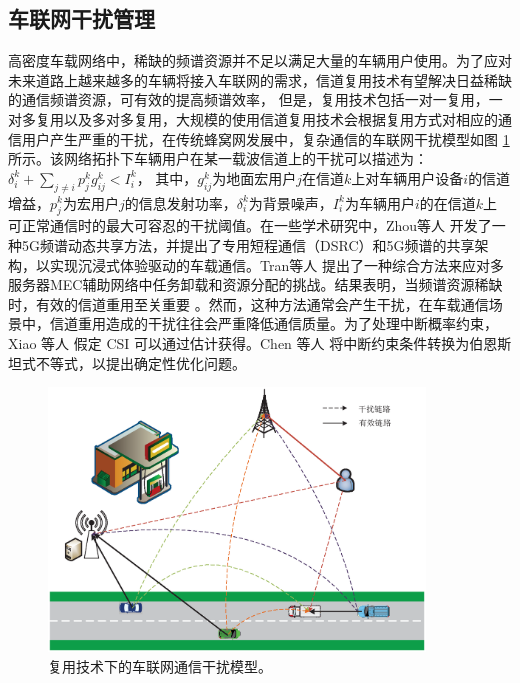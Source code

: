 \subsection{车联网干扰管理}\label{section1-2-1}

高密度车载网络中，稀缺的频谱资源并不足以满足大量的车辆用户使用。为了应对未来道路上越来越多的车辆将接入车联网的需求，信道复用技术有望解决日益稀缺的通信频谱资源，可有效的提高频谱效率，
但是，复用技术包括一对一复用，一对多复用以及多对多复用，大规模的使用信道复用技术会根据复用方式对相应的通信用户产生严重的干扰，在传统蜂窝网发展中，复杂通信的车联网干扰模型如图 \ref{复用技术下的通信干扰模型} 所示。该网络拓扑下车辆用户在某一载波信道上的干扰可以描述为：$\delta _{i}^{k}+\sum\limits_{j\ne i}{p_{j}^{k}g_{ij}^{k}}<I_{i}^{k}$，
其中，$g_{ij}^{k}$为地面宏用户$j$在信道$k$上对车辆用户设备$i$的信道增益，$p_{j}^{k}$为宏用户$j$的信息发射功率，$\delta _{i}^{k}$为背景噪声，$I_{i}^{k}$为车辆用户$i$的在信道$k$上
可正常通信时的最大可容忍的干扰阈值。在一些学术研究中，Zhou等人  \cite{Zhou2017} 开发了一种5G频谱动态共享方法，并提出了专用短程通信（DSRC）和5G频谱的共享架构，以实现沉浸式体验驱动的车载通信。Tran等人  \cite{Tran2019}  提出了一种综合方法来应对多服务器MEC辅助网络中任务卸载和资源分配的挑战。结果表明，当频谱资源稀缺时，有效的信道重用至关重要 \cite{Liang2021}。然而，这种方法通常会产生干扰，在车载通信场景中，信道重用造成的干扰往往会严重降低通信质量。为了处理中断概率约束，Xiao 等人 \cite{Xiao2020} 假定 CSI 可以通过估计获得。Chen 等人 \cite{Chen2022} 将中断约束条件转换为伯恩斯坦式不等式，以提出确定性优化问题。
\begin{figure}[H]
\centering
\includegraphics[width=10cm]{figures//chap1//车联网的干扰模型.eps}
\caption{复用技术下的车联网通信干扰模型。}
\label{复用技术下的通信干扰模型}
\end{figure}
